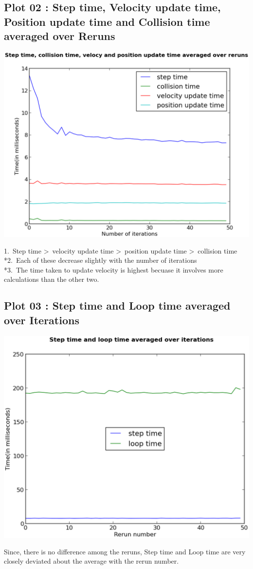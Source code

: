 \documentclass[11pt]{article}
\begin{document}
\subsection{Plot 02 : Step time, Velocity update time, Position update time and Collision time averaged over Reruns}
\begin{center}
\includegraphics[scale=0.5]{plot02}
\end{center}
1.\ Step time \textgreater \ velocity update time \textgreater \ position update time \textgreater \ collision time
\\*2.\ Each of these decrease slightly with the number of iterations
\\*3.\ The time taken to update velocity is highest becuase it involves more calculations than the other two.
\subsection{Plot 03 : Step time and Loop time averaged over Iterations}
\begin{center}
\includegraphics[scale=0.5]{plot03}
\end{center}
Since, there is no difference among the reruns, Step time and Loop time are very closely deviated about the average with the rerun number.
\end{document}
